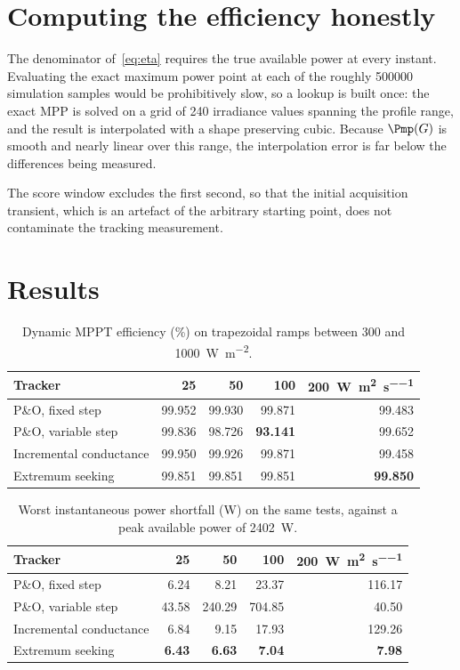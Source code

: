 \section{Computing the efficiency honestly}

The denominator of~\eqref{eq:eta} requires the true available power at every
instant. Evaluating the exact maximum power point at each of the roughly
\num{500000} simulation samples would be prohibitively slow, so a lookup is
built once: the exact MPP is solved on a grid of \num{240} irradiance values
spanning the profile range, and the result is interpolated with a shape
preserving cubic. Because $\Pmp(G)$ is smooth and nearly linear over this range,
the interpolation error is far below the differences being measured.

The score window excludes the first second, so that the initial acquisition
transient, which is an artefact of the arbitrary starting point, does not
contaminate the tracking measurement.

\section{Results}

\begin{table}[htbp]
\centering
\caption{Dynamic MPPT efficiency (\si{\percent}) on trapezoidal ramps between \SI{300}{} and \SI{1000}{\watt\per\square\metre}.}
\label{tab:dyneta}
\begin{tabular}{@{}lrrrr@{}}
\toprule
\textbf{Tracker} & \SI{25}{} & \SI{50}{} & \SI{100}{} & \SI{200}{\watt\per\square\metre\per\second} \\
\midrule
P\&O, fixed step        & 99.952 & 99.930 & 99.871 & 99.483 \\
P\&O, variable step     & 99.836 & 98.726 & \textbf{93.141} & 99.652 \\
Incremental conductance & 99.950 & 99.926 & 99.871 & 99.458 \\
Extremum seeking        & 99.851 & 99.851 & 99.851 & \textbf{99.850} \\
\bottomrule
\end{tabular}
\end{table}

\begin{table}[htbp]
\centering
\caption{Worst instantaneous power shortfall (\si{\watt}) on the same tests, against a peak available power of \SI{2402}{\watt}.}
\label{tab:dyndef}
\begin{tabular}{@{}lrrrr@{}}
\toprule
\textbf{Tracker} & \SI{25}{} & \SI{50}{} & \SI{100}{} & \SI{200}{\watt\per\square\metre\per\second} \\
\midrule
P\&O, fixed step        & 6.24  & 8.21   & 23.37  & 116.17 \\
P\&O, variable step     & 43.58 & 240.29 & 704.85 & 40.50 \\
Incremental conductance & 6.84  & 9.15   & 17.93  & 129.26 \\
Extremum seeking        & \textbf{6.43} & \textbf{6.63} & \textbf{7.04} & \textbf{7.98} \\
\bottomrule
\end{tabular}
\end{table}

